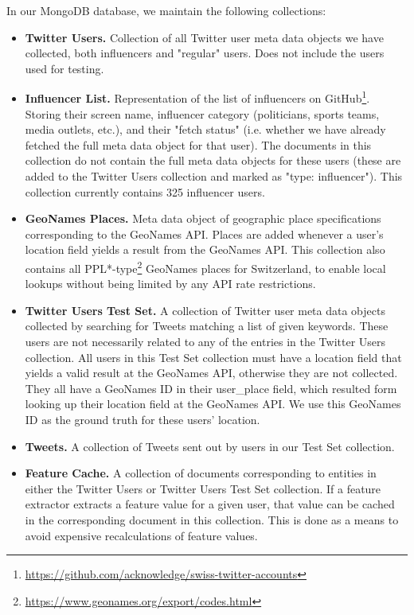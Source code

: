 \documentclass[10pt,a4paper]{article}
\begin{document}
In our MongoDB database, we maintain the following collections:
\begin{itemize}
\item \textbf{Twitter Users.} Collection of all Twitter user meta data objects we have collected, both influencers and "regular" users. Does not include the users used for testing.
\item \textbf{Influencer List.} Representation of the list of influencers on GitHub\footnote{\href{https://github.com/acknowledge/swiss-twitter-accounts}{https://github.com/acknowledge/swiss-twitter-accounts}}. Storing their screen name, influencer category (politicians, sports teams, media outlets, etc.), and their "fetch status" (i.e. whether we have already fetched the full meta data object for that user). The documents in this collection do not contain the full meta data objects for these users (these are added to the Twitter Users collection and marked as "type: influencer"). This collection currently contains 325 influencer users.
\item \textbf{GeoNames Places.} Meta data object of geographic place specifications corresponding to the GeoNames API. Places are added whenever a user's location field yields a result from the GeoNames API. This collection also contains all PPL*-type\footnote{\href{https://www.geonames.org/export/codes.html}{https://www.geonames.org/export/codes.html}}  GeoNames places for Switzerland, to enable local lookups without being limited by any API rate restrictions.
\item \textbf{Twitter Users Test Set.} A collection of Twitter user meta data objects collected by searching for Tweets matching a list of given keywords. These users are not necessarily related to any of the entries in the Twitter Users collection. All users in this Test Set collection must have a location field that yields a valid result at the GeoNames API, otherwise they are not collected. They all have a GeoNames ID in their user\_place field, which resulted form looking up their location field at the GeoNames API. We use this GeoNames ID as the ground truth for these users' location.
\item \textbf{Tweets.} A collection of Tweets sent out by users in our Test Set collection. 
\item \textbf{Feature Cache.} A collection of documents corresponding to entities in either the Twitter Users or Twitter Users Test Set collection. If a feature extractor extracts a feature value for a given user, that value can be cached in the corresponding document in this collection. This is done as a means to avoid expensive recalculations of feature values.
\end{itemize}
\end{document}
